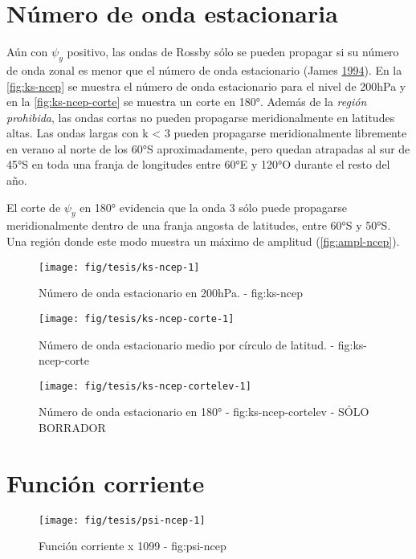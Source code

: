 \documentclass[spanish,a4paper]{book}
\begin{document}
\section{Número de onda estacionaria}\label{numero-de-onda-estacionaria}

Aún con \(\psi_y\) positivo, las ondas de Rossby sólo se pueden propagar
si su número de onda zonal es menor que el número de onda estacionario
(James \protect\hyperlink{ref-James}{1994}). En la \autoref{fig:ks-ncep}
se muestra el número de onda estacionario para el nivel de 200hPa y en
la \autoref{fig:ks-ncep-corte} se muestra un corte en 180°. Además de la
\emph{región prohibida}, las ondas cortas no pueden propagarse
meridionalmente en latitudes altas. Las ondas largas con k \textless{} 3
pueden propagarse meridionalmente libremente en verano al norte de los
60°S aproximadamente, pero quedan atrapadas al sur de 45°S en toda una
franja de longitudes entre 60°E y 120°O durante el resto del año.

El corte de \(\psi_y\) en 180° evidencia que la onda 3 sólo puede
propagarse meridionalmente dentro de una franja angosta de latitudes,
entre 60°S y 50°S. Una región donde este modo muestra un máximo de
amplitud (\autoref{fig:ampl-ncep}).

\begin{figure}
\texttt{[image: fig/tesis/ks-ncep-1]} \caption{Número de onda estacionario en 200hPa. - fig:ks-ncep}\label{fig:ks-ncep}
\end{figure}

\begin{figure}

{\centering \texttt{[image: fig/tesis/ks-ncep-corte-1]} 

}

\caption{Número de onda estacionario medio por círculo de latitud. - fig:ks-ncep-corte}\label{fig:ks-ncep-corte}
\end{figure}

\begin{figure}
\texttt{[image: fig/tesis/ks-ncep-cortelev-1]} \caption{Número de onda estacionario en 180° - fig:ks-ncep-cortelev - SÓLO BORRADOR}\label{fig:ks-ncep-cortelev}
\end{figure}

\section{Función corriente}\label{funcion-corriente}

\begin{figure}

{\centering \texttt{[image: fig/tesis/psi-ncep-1]} 

}

\caption{Función corriente x 1099 - fig:psi-ncep}\label{fig:psi-ncep}
\end{figure}
\end{document}
